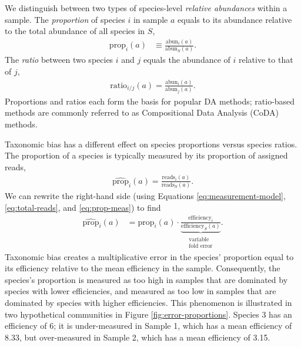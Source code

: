 \documentclass[
]{article}
\begin{document}
We distinguish between two types of species-level \emph{relative abundances} within a sample.
The \emph{proportion} of species \(i\) in sample \(a\) equals to its abundance relative to the total abundance of all species in \(S\),
\begin{align}
  \label{eq:prop}
  \text{prop}_{i}(a) 
    &\equiv \frac{\text{abun}_i(a)}{\text{abun}_S(a)}.
\end{align}
The \emph{ratio} between two species \(i\) and \(j\) equals the abundance of \(i\) relative to that of \(j\),
\begin{align}
  \label{eq:ratio}
  \text{ratio}_{i/j}(a) = \frac{\text{abun}_i(a)}{\text{abun}_j(a)}.
\end{align}
Proportions and ratios each form the basis for popular DA methods;
ratio-based methods are commonly referred to as Compositional Data Analysis (CoDA) methods.

Taxonomic bias has a different effect on species proportions versus species ratios.
The proportion of a species is typically measured by its proportion of assigned reads,
\begin{align}
  \label{eq:prop-meas}
  \widehat{\text{prop}}_{i}(a) = \frac{\text{reads}_i(a)}{\text{reads}_S(a)}.
\end{align}
We can rewrite the right-hand side (using Equations \eqref{eq:measurement-model}, \eqref{eq:total-reads}, and \eqref{eq:prop-meas}) to find
\begin{align}
  \label{eq:prop-error}
  \widehat{\text{prop}}_{i}(a)
  &= \text{prop}_{i}(a) \cdot \underbrace{\frac{\text{efficiency}_{i}}{\text{efficiency}_S(a)}}_{\substack{\text{variable} \\ \text{fold error}}}.
\end{align}
Taxonomic bias creates a multiplicative error in the species' proportion equal to its efficiency relative to the mean efficiency in the sample.
Consequently, the species's proportion is measured as too high in samples that are dominated by species with lower efficiencies, and measured as too low in samples that are dominated by species with higher efficiencies.
This phenomenon is illustrated in two hypothetical communities in Figure \ref{fig:error-proportions}.
Species 3 has an efficiency of 6; it is under-measured in Sample 1, which has a mean efficiency of 8.33, but over-measured in Sample 2, which has a mean efficiency of 3.15.
\end{document}
